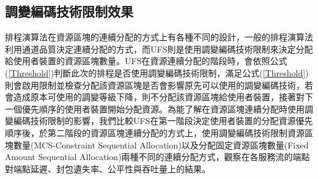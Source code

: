 \subsection{調變編碼技術限制效果}
排程演算法在資源區塊的連續分配的方式上有各種不同的設計，一般的排程演算法利用通道品質決定連續分配的方式，而UFS則是使用調變編碼技術限制來決定分配給使用者裝置的資源區塊數量。UFS在資源連續分配的階段時，會依照公式(\ref{Threshold})判斷此次的排程是否使用調變編碼技術限制，滿足公式(\ref{Threshold})則會啟用限制並檢查分配該資源區塊是否會影響原先可以使用的調變編碼技術，若會造成原本可使用的調變等級下降，則不分配該資源區塊給使用者裝置，接著對下一個優先順序的使用者裝置開始分配資源。為能了解在資源區塊連續分配時使用調變編碼技術限制的影響，我們比較UFS在第一階段決定使用者裝置的分配資源優先順序後，於第二階段的資源區塊連續分配的方式上，使用調變編碼技術限制資源區塊數量(MCS-Constraint Sequential Allocation)以及分配固定資源區塊數量(Fixed Amount Sequential Allocation)兩種不同的連續分配方式，觀察在各服務流的端點對端點延遲、封包遺失率、公平性與吞吐量上的結果。
